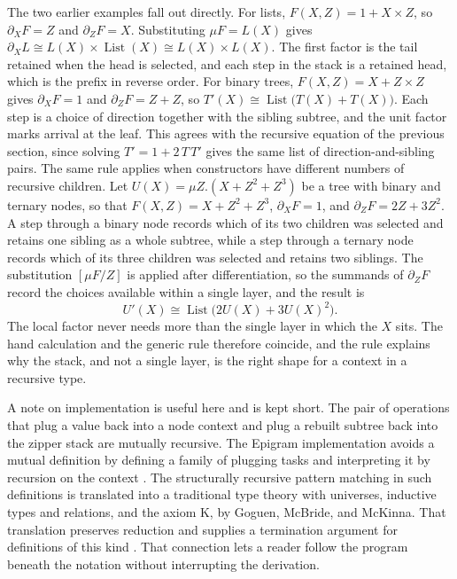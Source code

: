 \documentclass[11pt]{article}
\begin{document}
The two earlier examples fall out directly. For lists, $F(X,Z)=1+X\times Z$, so $\partial_X F = Z$ and $\partial_Z F = X$. Substituting $\mu F = L(X)$ gives $\partial_X L \cong L(X)\times\operatorname{List}(X)\cong L(X)\times L(X)$. The first factor is the tail retained when the head is selected, and each step in the stack is a retained head, which is the prefix in reverse order. For binary trees, $F(X,Z)=X+Z\times Z$ gives $\partial_X F = 1$ and $\partial_Z F = Z+Z$, so $T'(X)\cong\operatorname{List}\bigl(T(X)+T(X)\bigr)$. Each step is a choice of direction together with the sibling subtree, and the unit factor marks arrival at the leaf. This agrees with the recursive equation of the previous section, since solving $T' = 1 + 2\,T\,T'$ gives the same list of direction-and-sibling pairs. The same rule applies when constructors have different numbers of recursive children. Let $U(X)=\mu Z.(X+Z^2+Z^3)$ be a tree with binary and ternary nodes, so that $F(X,Z)=X+Z^2+Z^3$, $\partial_X F=1$, and $\partial_Z F=2Z+3Z^2$. A step through a binary node records which of its two children was selected and retains one sibling as a whole subtree, while a step through a ternary node records which of its three children was selected and retains two siblings. The substitution $[\mu F/Z]$ is applied after differentiation, so the summands of $\partial_Z F$ record the choices available within a single layer, and the result is
\[
U'(X)\cong\operatorname{List}\bigl(2U(X)+3U(X)^2\bigr).
\]
The local factor never needs more than the single layer in which the $X$ sits. The hand calculation and the generic rule therefore coincide, and the rule explains why the stack, and not a single layer, is the right shape for a context in a recursive type.

A note on implementation is useful here and is kept short. The pair of operations that plug a value back into a node context and plug a rebuilt subtree back into the zipper stack are mutually recursive. The Epigram implementation avoids a mutual definition by defining a family of plugging tasks and interpreting it by recursion on the context \cite{morris2006}. The structurally recursive pattern matching in such definitions is translated into a traditional type theory with universes, inductive types and relations, and the axiom K, by Goguen, McBride, and McKinna. That translation preserves reduction and supplies a termination argument for definitions of this kind \cite{goguen2006}. That connection lets a reader follow the program beneath the notation without interrupting the derivation.
\end{document}
